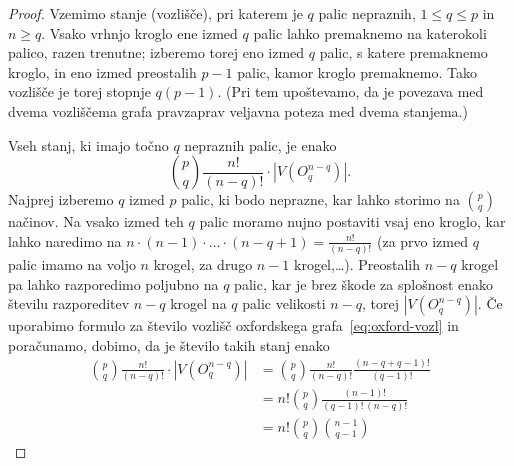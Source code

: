 \documentclass[11pt,a4paper]{article}
\theoremstyle{definition} %
\theoremstyle{plain} %
\begin{document}
\begin{proof}
    Vzemimo stanje (vozlišče), pri katerem je $q$ palic nepraznih, $1 \leq q \leq p$ in $n \geq q$. Vsako vrhnjo kroglo ene izmed $q$ palic lahko premaknemo na katerokoli palico, razen trenutne; izberemo torej eno izmed $q$ palic, s katere premaknemo kroglo, in eno izmed preostalih $p-1$ palic, kamor kroglo premaknemo. Tako vozlišče je torej stopnje $q(p-1)$. (Pri tem upoštevamo, da je povezava med dvema vozliščema grafa pravzaprav veljavna poteza med dvema stanjema.)
    
    Vseh stanj, ki imajo točno $q$ nepraznih palic, je enako
    \[{p \choose q} \frac{n!}{(n-q)!} \cdot |V(O^{n-q}_q)|.\]
    Najprej izberemo $q$ izmed $p$ palic, ki bodo neprazne, kar lahko storimo na ${p \choose q}$ načinov. Na vsako izmed teh $q$ palic moramo nujno postaviti vsaj eno kroglo, kar lahko naredimo na $n \cdot (n-1) \cdot \ldots \cdot (n-q+1) = \frac{n!}{(n-q)!}$ (za prvo izmed $q$ palic imamo na voljo $n$ krogel, za drugo $n-1$ krogel,\ldots). Preostalih $n-q$ krogel pa lahko razporedimo poljubno na $q$ palic, kar je brez škode za splošnost enako številu razporeditev $n-q$ krogel na $q$ palic velikosti $n-q$, torej $|V(O^{n-q}_q)|$.
    Če uporabimo formulo za število vozlišč oxfordskega grafa~\eqref{eq:oxford-vozl} in poračunamo, dobimo, da je število takih stanj enako
    \begin{align*}
    {p \choose q} \frac{n!}{(n-q)!} \cdot |V(O^{n-q}_q)| &=
    {p \choose q} \frac{n!}{(n-q)!} \frac{(n-q+q-1)!}{(q-1)!} \\ &= n! {p \choose q} \frac{(n-1)!}{(q-1)!\,(n-q)!} \\ &=
    n! {p \choose q} {n-1 \choose q-1}
    \end{align*}
    

\end{proof}
\end{document}
